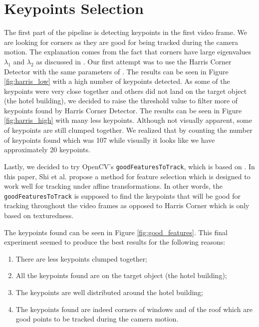 \documentclass[]{IEEEtran}
\begin{document}
\section{Keypoints Selection}
The first part of the pipeline is detecting keypoints in the first video frame. We are looking for corners as they are good for being tracked during the camera motion. The explanation comes from the fact that corners have large eigenvalues $\lambda_1$ and $\lambda_2$ as discussed in \cite{illinois_cv}. Our first attempt was to use the Harris Corner Detector with the same parameters of \cite{py_features_harris}. The results can be seen in Figure \ref{fig:harris_low} with a high number of keypoints detected. As some of the keypoints were very close together and others did not land on the target object (the hotel building), we decided to raise the threshold value to filter more of keypoints found by Harris Corner Detector. The results can be seen in Figure \ref{fig:harris_high} with many less keypoints. Although not visually apparent, some of keypoints are still clumped together. We realized that by counting the number of keypoints found which was 107 while visually it looks like we have approximately 20 keypoints.

Lastly, we decided to try OpenCV's \texttt{goodFeaturesToTrack}, which is based on \cite{good_features_paper}. In this paper, Shi et al. propose a method for feature selection  which is designed to work well for tracking under affine transformations. In other words, the \texttt{goodFeaturesToTrack} is supposed to find the keypoints that will be good for tracking throughout the video frames as opposed to Harris Corner which is only based on texturedness.

The keypoints found can be seen in Figure \ref{fig:good_features}. This final experiment seemed to produce the best results for the following reasons:
\begin{enumerate}
\item There are less keypoints clumped together;
\item All the keypoints found are on the target object (the hotel building);
\item The keypoints are well distributed around the hotel building;
\item The keypoints found are indeed corners of windows and of the roof which are good points to be tracked during the camera motion.
\end{enumerate}
\end{document}
